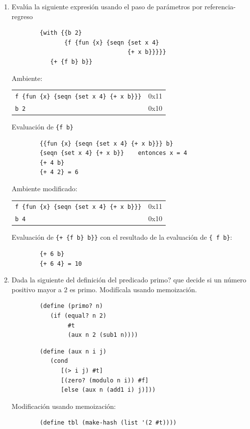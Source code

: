 \documentclass[letterpaper,11pt]{article}
\begin{document}
\begin{enumerate}
    \item Evalúa la siguiente expresión usando el paso de parámetros por referencia-regreso
    \begin{verbatim}
        {with {{b 2}
               {f {fun {x} {seqn {set x 4}
                                 {+ x b}}}}}
           {+ {f b} b}}
    \end{verbatim}
    Ambiente:
    \begin{center}
        \begin{tabular}{|l| c }
        \cline{1-1}
            \texttt{f \hspace{1cm} \{fun \{x\} \{seqn \{set x  4\} \{+ x b\}\}\}} & 0x11\\\cline{1-1}
            \texttt{b \hspace{1.4cm} 2} & 0x10\\\cline{1-1}
        \end{tabular}
    \end{center}
    Evaluación de \texttt{\{f b\}}
    \begin{verbatim}
        {{fun {x} {seqn {set x 4} {+ x b}}} b}
        {seqn {set x 4} {+ x b}}    entonces x = 4
        {+ 4 b}
        {+ 4 2} = 6
    \end{verbatim}
    Ambiente modificado:
    \begin{center}
        \begin{tabular}{|l| c }
        \cline{1-1}
            \texttt{f \hspace{1cm} \{fun \{x\} \{seqn \{set x  4\} \{+ x b\}\}\}} & 0x11\\\cline{1-1}
            \texttt{b \hspace{1.4cm} 4} & 0x10\\\cline{1-1}
        \end{tabular}
    \end{center}
    Evaluación de \texttt{\{+ \{f b\} b\}\}} con el resultado de la evaluación de \texttt{\{ f b\}}:
    \begin{verbatim}
        {+ 6 b}
        {+ 6 4} = 10
    \end{verbatim}
    
    \item Dada la siguiente del definición del predicado primo? que decide si un número positivo mayor a $2$ es primo. Modifícala usando memoización.
    \begin{verbatim}
        (define (primo? n)
           (if (equal? n 2)
                #t
                (aux n 2 (sub1 n))))
    \end{verbatim}
    \begin{verbatim}
        (define (aux n i j)
           (cond 
              [(> i j) #t]
              [(zero? (modulo n i)) #f]
              [else (aux n (add1 i) j)]))
    \end{verbatim}
    Modificación usando memoización:
    \begin{verbatim}
        (define tbl (make-hash (list '(2 #t))))
        

\end{verbatim}
\end{enumerate}
\end{document}
